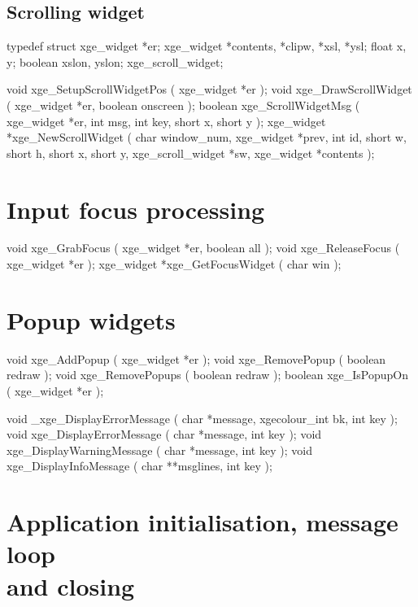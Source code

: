 \subsection{Scrolling widget}

\begin{listingC}
typedef struct {
    xge_widget *er;
    xge_widget *contents, *clipw, *xsl, *ysl;
    float      x, y;
    boolean    xslon, yslon;
  } xge_scroll_widget;

void xge_SetupScrollWidgetPos ( xge_widget *er );
void xge_DrawScrollWidget ( xge_widget *er, boolean onscreen );
boolean xge_ScrollWidgetMsg ( xge_widget *er,
                              int msg, int key, short x, short y );
xge_widget *xge_NewScrollWidget ( char window_num, xge_widget *prev,
                      int id,
                      short w, short h, short x, short y,
                      xge_scroll_widget *sw, xge_widget *contents );
\end{listingC}


\newpage
\section{Input focus processing}

\begin{listingC}
void xge_GrabFocus ( xge_widget *er, boolean all );
void xge_ReleaseFocus ( xge_widget *er );
xge_widget *xge_GetFocusWidget ( char win );
\end{listingC}


\section{Popup widgets}

\begin{listingC}
void xge_AddPopup ( xge_widget *er );
void xge_RemovePopup ( boolean redraw );
void xge_RemovePopups ( boolean redraw );
boolean xge_IsPopupOn ( xge_widget *er );

void _xge_DisplayErrorMessage ( char *message,
                                xgecolour_int bk, int key );
void xge_DisplayErrorMessage ( char *message, int key );
void xge_DisplayWarningMessage ( char *message, int key );
void xge_DisplayInfoMessage ( char **msglines, int key );
\end{listingC}


\section[Application initialisation, message loop and closing]%
{Application initialisation, message loop \\ and closing}

